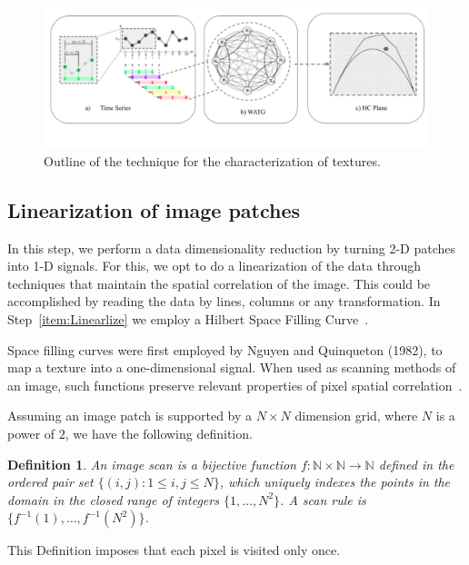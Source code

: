 \documentclass[paper=letter, fontsize=12pt]{article}
\begin{document}
	
	\begin{figure}[hbt]
		\centering
		\includegraphics[width=\linewidth]{Figures/WATG.pdf}
		\vspace{-.8cm}
		\caption{Outline of the technique for the characterization of textures.}
		\label{fig:WATG}
	\end{figure}
	
	\subsection{Linearization of image patches}\label{linearization}
	
	In this step, we perform a data dimensionality reduction by turning 2-D patches into 1-D signals.
	For this, we opt to do a linearization of the data through techniques that maintain the spatial correlation of the image.
	This could be accomplished by reading the data by lines, columns or any transformation.
	In Step~\ref{item:Linearlize} we employ a Hilbert Space Filling Curve~\cite{Lee1994Texture}.
	
	Space filling curves were first employed by Nguyen and Quinqueton (1982), to map a texture into a one-dimensional signal.
	When used as scanning methods of an image, such functions preserve relevant properties of pixel spatial correlation~\cite{Lee1994Texture}.
	
	Assuming an image patch is supported by a $N \times N$ dimension grid, where $N$ is a power of $2$, we have the following definition.
	
	\newtheorem{mydef}{Definition}
	\begin{mydef}
		An image scan is a bijective function $f \colon \mathbb{N} \times \mathbb{N} \to \mathbb{N}$ defined in the ordered pair set $ \{(i, j): 1 \leq i , j \leq N \}$, which uniquely indexes the points in the domain in the closed range of integers $\{1, \dots, N^2\}$.
		A scan rule is $\{f^{-1}(1), \dots, f^{-1}(N^2)\}$.
		\label{def:CurveFilling}
	\end{mydef}
	This Definition imposes that each pixel is visited only once.
	
\end{document}
